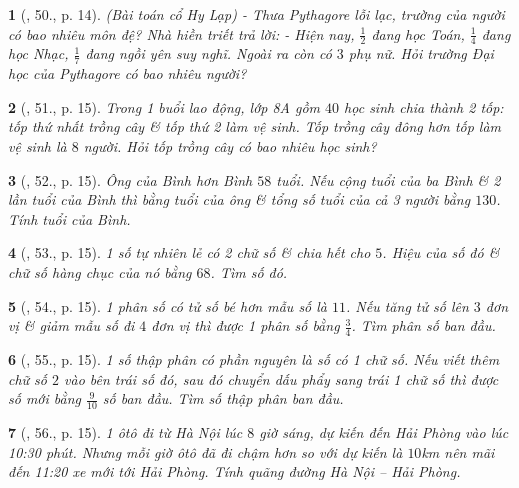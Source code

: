 \documentclass{article}
\newtheorem{baitoan}{}
\begin{document}
\begin{baitoan}[\cite{SBT_Toan_8_tap_2}, 50., p. 14]
	\emph{(Bài toán cổ Hy Lạp)} - Thưa Pythagore lỗi lạc, trường của người có bao nhiêu môn đệ? Nhà hiền triết trả lời: - Hiện nay, $\frac{1}{2}$ đang học Toán, $\frac{1}{4}$ đang học Nhạc, $\frac{1}{7}$ đang ngồi yên suy nghĩ. Ngoài ra còn có $3$ phụ nữ. Hỏi trường Đại học của Pythagore có bao nhiêu người?
\end{baitoan}

\begin{baitoan}[\cite{SBT_Toan_8_tap_2}, 51., p. 15]
	Trong 1 buổi lao động, lớp 8A gồm $40$ học sinh chia thành 2 tốp: tốp thứ nhất trồng cây \& tốp thứ 2 làm vệ sinh. Tốp trồng cây đông hơn tốp làm vệ sinh là $8$ người. Hỏi tốp trồng cây có bao nhiêu học sinh?	
\end{baitoan}

\begin{baitoan}[\cite{SBT_Toan_8_tap_2}, 52., p. 15]
	Ông của Bình hơn Bình $58$ tuổi. Nếu cộng tuổi của ba Bình \& 2 lần tuổi của Bình thì bằng tuổi của ông \& tổng số tuổi của cả 3 người bằng $130$. Tính tuổi của Bình.	
\end{baitoan}

\begin{baitoan}[\cite{SBT_Toan_8_tap_2}, 53., p. 15]
	1 số tự nhiên lẻ có 2 chữ số \& chia hết cho $5$. Hiệu của số đó \& chữ số hàng chục của nó bằng $68$. Tìm số đó.
\end{baitoan}

\begin{baitoan}[\cite{SBT_Toan_8_tap_2}, 54., p. 15]
	1 phân số có tử số bé hơn mẫu số là $11$. Nếu tăng tử số lên $3$ đơn vị \& giảm mẫu số đi $4$ đơn vị thì được 1 phân số bằng $\frac{3}{4}$. Tìm phân số ban đầu.
\end{baitoan}

\begin{baitoan}[\cite{SBT_Toan_8_tap_2}, 55., p. 15]
	1 số thập phân có phần nguyên là số có 1 chữ số. Nếu viết thêm chữ số $2$ vào bên trái số đó, sau đó chuyển dấu phẩy sang trái 1 chữ số thì được số mới bằng $\frac{9}{10}$ số ban đầu. Tìm số thập phân ban đầu.
\end{baitoan}

\begin{baitoan}[\cite{SBT_Toan_8_tap_2}, 56., p. 15]
	1 ôtô đi từ Hà Nội lúc $8$ giờ sáng, dự kiến đến Hải Phòng vào lúc 10:30 phút. Nhưng mỗi giờ ôtô đã đi chậm hơn so với dự kiến là $10$\emph{km} nên mãi đến 11:20 xe mới tới Hải Phòng. Tính quãng đường Hà Nội -- Hải Phòng.
\end{baitoan}
\end{document}
